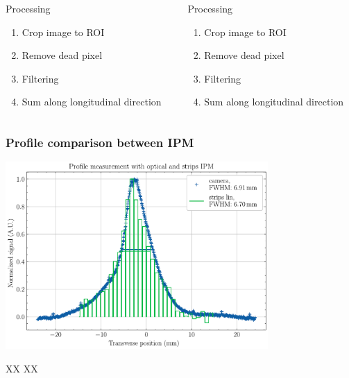\begin{frame}
\begin{columns}[T]
\begin{column}{0.45\textwidth}
\begin{block}{Processing}
\begin{enumerate}
          \item Crop image to ROI
          \item Remove dead pixel
          \item Filtering
          \item Sum along longitudinal direction
        \end{enumerate}
      \end{block}
    \end{column}
    \begin{column}{0.45\textwidth}
      \begin{block}{Processing}
        \begin{enumerate}
          \item Crop image to ROI
          \item Remove dead pixel
          \item Filtering
          \item Sum along longitudinal direction
        \end{enumerate}
      \end{block}
    \end{column}
  \end{columns}
\end{frame}

\begin{frame}
  \frametitle{Profile comparison between IPM}
  \begin{center}
    \includegraphics[width=0.75\textwidth]{04_Test/fig/fig000_MCP_strip}

  \end{center}
  \begin{block}{XX}
    XX
  \end{block}
\end{frame}


